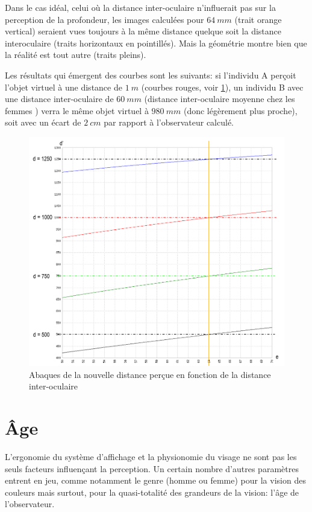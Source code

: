 	\par Dans le cas idéal, celui où la distance inter-oculaire n'influerait pas sur la perception de la profondeur, les images calculées pour $64~mm$ (trait orange vertical) seraient vues toujours à la même distance quelque soit la distance interoculaire (traits horizontaux en pointillés). Mais la géométrie montre bien que la réalité est tout autre (traits pleins).
	
	\par Les résultats qui émergent des courbes sont les suivants: si l'individu A perçoit l'objet virtuel à une distance de $1~m$ (courbes rouges, voir \ref{fig:abaque_dio}), un individu B avec une distance inter-oculaire de $60~mm$ (distance inter-oculaire moyenne chez les femmes \citep{dodgson_variation_2004}) verra le même objet virtuel à $980~mm$ (donc légèrement plus proche), soit avec un écart de $2~cm$ par rapport à l'observateur calculé.
	
	\begin{figure}
		\centering
		\includegraphics[scale=.8]{Figures/AbaqueDIO}
		\caption{Abaques de la nouvelle distance perçue en fonction de la distance inter-oculaire}
		\label{fig:abaque_dio}
	\end{figure}
	
	\section{Âge}
	\par L'ergonomie du système d'affichage et la physionomie du visage ne sont pas les seuls facteurs influençant la perception. Un certain nombre d'autres paramètres entrent en jeu, comme notamment le genre (homme ou femme) pour la vision des couleurs \citep{fairchild_human_2005} mais surtout, pour la quasi-totalité des grandeurs de la vision: l'âge de l'observateur.
	
